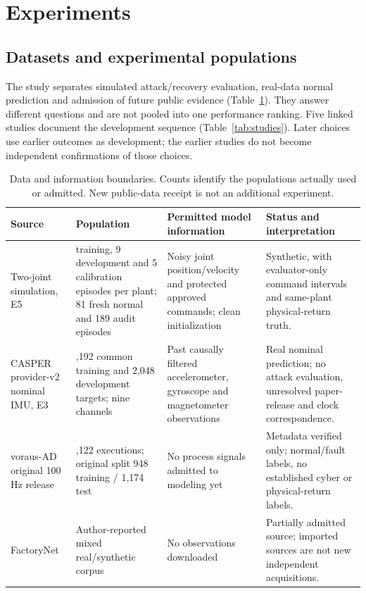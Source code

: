 \section{Experiments}\label{sec:experiments}
\subsection{Datasets and experimental populations}
The study separates simulated attack/recovery evaluation, real-data normal prediction and admission of future public evidence (Table~\ref{tab:data}). They answer different questions and are not pooled into one performance ranking. Five linked studies document the development sequence (Table~\ref{tab:studies}). Later choices use earlier outcomes as development; the earlier studies do not become independent confirmations of those choices.

\begin{table}[t]\centering
\caption{Data and information boundaries. Counts identify the populations actually used or admitted. New public-data receipt is not an additional experiment.}\label{tab:data}
\begin{tabular}{>{\raggedright\arraybackslash}p{}>{\raggedright\arraybackslash}p{}>{\raggedright\arraybackslash}p{}>{\raggedright\arraybackslash}p{}}\toprule
Source & Population & Permitted model information & Status and interpretation\\\midrule
Two-joint simulation, E5 & 3 training, 9 development and 5 calibration episodes per plant; 81 fresh normal and 189 audit episodes & Noisy joint position/velocity and protected approved commands; clean initialization & Synthetic, with evaluator-only command intervals and same-plant physical-return truth.\\
CASPER provider-v2 nominal IMU, E3 & 8,192 common training and 2,048 development targets; nine channels & Past causally filtered accelerometer, gyroscope and magnetometer observations & Real nominal prediction; no attack evaluation, unresolved paper-release and clock correspondence.\\
voraus-AD original 100 Hz release & 2,122 executions; original split 948 training / 1,174 test & No process signals admitted to modeling yet & Metadata verified only; normal/fault labels, no established cyber or physical-return labels.\\
FactoryNet & Author-reported mixed real/synthetic corpus & No observations downloaded & Partially admitted source; imported sources are not new independent acquisitions.\\\bottomrule
\end{tabular}
\end{table}

